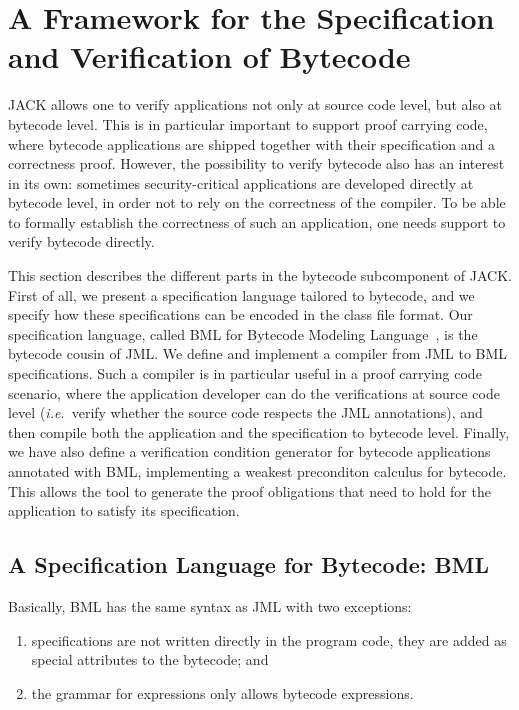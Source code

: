 \section{A Framework for the Specification and Verification of Bytecode}\label{SecBytecode}

JACK allows one to verify applications not only at source code level,
but also at bytecode level. This is in particular important to support
proof carrying code, where bytecode applications are shipped together
with their specification and a correctness proof. However, the
possibility to verify bytecode also has an interest in its own: 
sometimes security-critical applications are developed directly at
bytecode level, in order not to rely on the correctness of the
compiler. To be able to formally establish the correctness of such an
application, one needs support to verify bytecode directly.

This section describes the different parts in the bytecode
subcomponent of JACK. First of all, we present a specification
language tailored to bytecode, and we specify how these specifications
can be encoded in the class file format. Our specification language,
called BML for Bytecode Modeling Language~\cite{BurdyHP07}, is the
bytecode cousin of JML. We define and implement a compiler from JML to
BML specifications. Such a compiler is in particular useful in a proof
carrying code scenario, where the application developer can do the
verifications at source code level (\emph{i.e.}\ verify whether the
source code respects the JML annotations), and then compile both the
application and the specification to bytecode level. Finally, we have
also define a verification condition generator for bytecode
applications annotated with BML, implementing a weakest preconditon
calculus for bytecode. This allows the tool to generate the proof
obligations that need to hold for the application to satisfy its
specification.

\subsection{A Specification Language for Bytecode: BML}

Basically, BML has the same syntax as JML with two exceptions:
\begin{enumerate}
\item specifications are not written directly in the program code,
they are added as special attributes to the bytecode; and
\item the grammar for expressions only allows bytecode expressions.
\end{enumerate}

